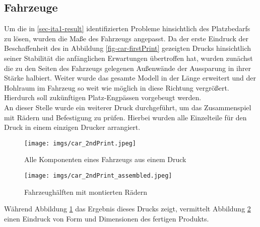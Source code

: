 \documentclass[.../Dokumentation.tex]{subfiles}
\begin{document}
\subsection{Fahrzeuge}\label{sec-ita2-cars}
Um die in \ref{sec-ita1-result} identifizierten Probleme hinsichtlich des 
Platzbedarfs zu lösen, wurden die Maße des Fahrzeugs angepasst.
Da der erste Eindruck der Beschaffenheit des in Abbildung 
\ref{fig-car-firstPrint} gezeigten Drucks hinsichtlich seiner Stabilität 
die anfänglichen Erwartungen übertroffen hat, wurden zunächst die zu den Seiten 
des Fahrzeugs gelegenen Außenwände der Aussparung in ihrer Stärke halbiert.
Weiter wurde das gesamte Modell in der Länge erweitert und der Hohlraum im 
Fahrzeug so weit wie möglich in diese Richtung vergrößert. Hierdurch soll 
zukünftigen Platz-Engpässen vorgebeugt werden.\\
An dieser Stelle wurde ein weiterer Druck durchgeführt, um das 
Zusammenspiel mit Rädern und Befestigung zu prüfen. Hierbei wurden alle 
Einzelteile für den Druck in einem einzigen Drucker arrangiert.
\begin{figure}[H]
\begin{center}
    \texttt{[image: imgs/car\_2ndPrint.jpeg]}
    \caption{Alle Komponenten eines Fahrzeugs aus einem Druck}
    \label{fig-car-2ndPrint}
\end{center}
\end{figure}
\begin{figure}[H]
\begin{center}
    \texttt{[image: imgs/car\_2ndPrint\_assembled.jpeg]}
    \vspace*{-2.75cm}
    \caption{Fahrzeughälften mit montierten Rädern}
    \label{fig-car-2ndPrint-assembled}
\end{center}
\end{figure}
\noindent
Während Abbildung \ref{fig-car-2ndPrint} das Ergebnis dieses Drucks zeigt, 
vermittelt Abbildung \ref{fig-car-2ndPrint-assembled} einen Eindruck 
von Form und Dimensionen des fertigen Produkts.
\end{document}
